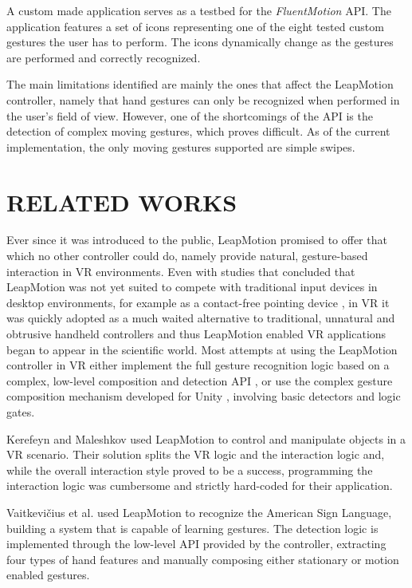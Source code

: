 \documentclass{sigchi}
\def\fluentmotion{\textit{FluentMotion}}
\def\leap{LeapMotion}
\begin{document}
A custom made application serves as a testbed for the \fluentmotion{} API. The application features a set of icons representing one of the eight tested custom gestures the user has to perform. The icons dynamically change as the gestures are performed and correctly recognized.

The main limitations identified are mainly the ones that affect the \leap{} controller, namely that hand gestures  can only be recognized when performed in the user's field of view. However, one of the shortcomings of the API is the detection of complex moving gestures, which proves difficult. As of the current implementation, the only moving gestures supported are simple swipes.

\section{RELATED WORKS}

Ever since it was introduced to the public, \leap{} promised to offer that which no other controller could do, namely provide natural, gesture-based interaction in VR environments. Even with studies that concluded that \leap{} was not yet suited to compete with traditional input devices in desktop environments, for example as a contact-free pointing device \cite{3149}, in VR it was quickly adopted as a much waited alternative to traditional, unnatural and obtrusive handheld controllers and thus \leap{} enabled VR applications began to appear in the scientific world. Most attempts at using the \leap{} controller in VR either implement the full gesture recognition logic based on a complex, low-level composition and detection API \cite{LMAPI}, or use the complex gesture composition mechanism developed for Unity \cite{LMUAPI}, involving basic detectors and logic gates. 

Kerefeyn and Maleshkov \cite{Kerefeyn} used \leap{} to control and manipulate objects in a VR scenario. Their solution splits the VR logic and the interaction logic and, while the overall interaction style proved to be a success, programming the interaction logic was cumbersome and strictly hard-coded for their application.

Vaitkevi\v{c}ius et al. \cite{Vaitkevicius} used \leap{} to recognize the American Sign Language, building a system that is capable of learning gestures. The detection logic is implemented through the low-level API provided by the controller, extracting four types of hand features and manually composing either stationary or motion enabled gestures.
\end{document}
